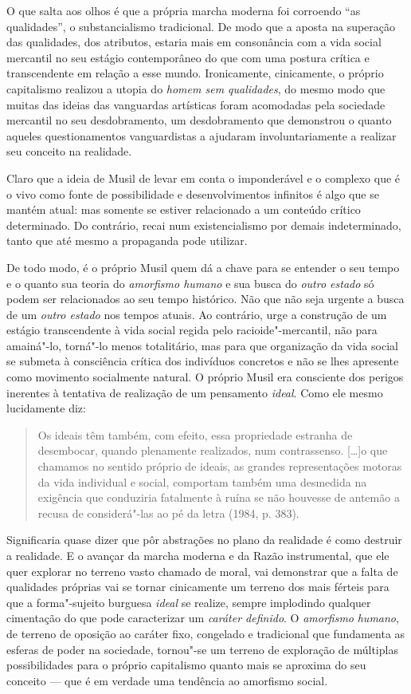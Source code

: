 O que salta aos olhos é que a própria marcha moderna foi corroendo ``as
qualidades'', o substancialismo tradicional. De modo que a aposta na
superação das qualidades, dos atributos, estaria mais em consonância com
a vida social mercantil no seu estágio contemporâneo do que com uma
postura crítica e transcendente em relação a esse mundo. Ironicamente,
cinicamente, o próprio capitalismo realizou a utopia do \emph{homem sem
qualidades}, do mesmo modo que muitas das ideias das vanguardas
artísticas foram acomodadas pela sociedade mercantil no seu
desdobramento, um desdobramento que demonstrou o quanto aqueles
questionamentos vanguardistas a ajudaram involuntariamente a realizar
seu conceito na realidade.

Claro que a ideia de Musil de levar em conta o imponderável e o complexo
que é o vivo como fonte de possibilidade e desenvolvimentos infinitos é
algo que se mantém atual: mas somente se estiver relacionado a um
conteúdo crítico determinado. Do contrário, recai num existencialismo por
demais indeterminado, tanto que até mesmo a propaganda pode utilizar.

De todo modo, é o próprio Musil quem dá a chave para se entender o seu
tempo e o quanto sua teoria do \emph{amorfismo humano} e sua busca do
\emph{outro estado} só podem ser relacionados ao seu tempo histórico.
Não que não seja urgente a busca de um \emph{outro estado} nos tempos
atuais. Ao contrário, urge a construção de um estágio transcendente à
vida social regida pelo racioide"-mercantil, não para amainá"-lo, torná"-lo
menos totalitário, mas para que organização da vida social se submeta à
consciência crítica dos indivíduos concretos e não se lhes apresente
como movimento socialmente natural. O próprio Musil era consciente dos
perigos inerentes à tentativa de realização de um pensamento
\emph{ideal}. Como ele mesmo lucidamente diz:

\begin{quote}
Os ideais têm também, com efeito, essa propriedade estranha de
desembocar, quando plenamente realizados, num contrassenso. [\ldots{}]o
que chamamos no sentido próprio de ideais, as grandes representações
motoras da vida individual e social, comportam também uma desmedida na
exigência que conduziria fatalmente à ruína se não houvesse de antemão a
recusa de considerá"-las ao pé da letra (1984, p. 383).
\end{quote}

Significaria quase dizer que pôr abstrações no plano da realidade é como
destruir a realidade. E o avançar da marcha moderna e da Razão
instrumental, que ele quer explorar no terreno vasto chamado de moral,
vai demonstrar que a falta de qualidades próprias vai se tornar
cinicamente um terreno dos mais férteis para que a forma"-sujeito
burguesa \emph{ideal} se realize, sempre implodindo qualquer cimentação
do que pode caracterizar um \emph{caráter definido}. O \emph{amorfismo}
\emph{humano}, de terreno de oposição ao caráter fixo, congelado e
tradicional que fundamenta as esferas de poder na sociedade, tornou"-se
um terreno de exploração de múltiplas possibilidades para o próprio
capitalismo quanto mais se aproxima do seu conceito --- que é em verdade
uma tendência ao amorfismo social.

